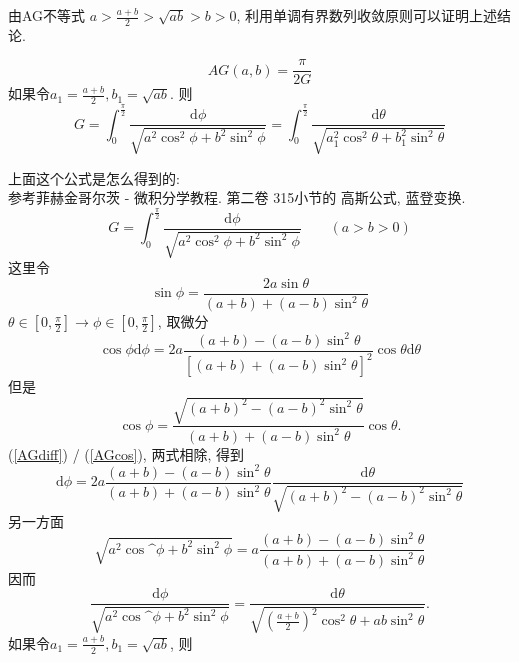 由AG不等式 $ a>\frac{a+b}{2}>\sqrt{ab}>b>0 $, 
利用单调有界数列收敛原则可以证明上述结论.

\begin{equation}\label{AGineqAns}
	AG(a,b)=\frac{\pi}{2G}
\end{equation}
如果令$ a_1 = \frac{a+b}{2}, b_1 = \sqrt{ab} $. 则
\begin{equation}\label{GaussAGineqInt}
	G = \int_{0}^{\frac{\pi}{2}}\frac{\text{d}\phi}{\sqrt{a^2\cos^2\phi+b^2\sin^2\phi}} 
	  = \int_{0}^{\frac{\pi}{2}}\frac{\text{d}\theta}{\sqrt{a_1^2\cos^2\theta+b_1^2\sin^2\theta}} 
\end{equation}

上面这个公式是怎么得到的:\\
参考菲赫金哥尔茨 - 微积分学教程. 第二卷 315小节的 高斯公式, 蓝登变换.\\
\begin{equation}\label{GaussAGineqInt001}
	G = \int_{0}^{\frac{\pi}{2}}\frac{\text{d}\phi}{\sqrt{a^2\cos^2\phi+b^2\sin^2\phi}} \qquad (a>b>0)
\end{equation}
这里令
\begin{equation}\label{LandenTf}
	\sin\phi = \frac{2a\sin\theta}{(a+b)+(a-b)\sin^2\theta}
\end{equation}
$ \theta \in[0,\frac{\pi}{2}] \rightarrow  \phi \in[0,\frac{\pi}{2}] $,
取微分
\begin{equation}\label{AGdiff}
	\cos\phi\text{d}\phi = 2a\frac{(a+b)-(a-b)\sin^2\theta}{[(a+b)+(a-b)\sin^2\theta]^2}\cos\theta\text{d}\theta
\end{equation}
但是
\begin{equation}\label{AGcos}
	\cos\phi = \frac{\sqrt{(a+b)^2-(a-b)^2\sin^2\theta}}{(a+b)+(a-b)\sin^2\theta}\cos\theta.
\end{equation}
(\ref{AGdiff}) / (\ref{AGcos}), 两式相除, 得到
\begin{equation}
	\text{d}\phi = 2a\frac{(a+b)-(a-b)\sin^2\theta}{(a+b)+(a-b)\sin^2\theta}\frac{\text{d}\theta}{\sqrt{(a+b)^2-(a-b)^2\sin^2\theta}}
\end{equation}
另一方面
\begin{equation}
	\sqrt{a^2\cos\^\phi+b^2\sin^2\phi} = a\frac{(a+b)-(a-b)\sin^2\theta}{(a+b)+(a-b)\sin^2\theta}
\end{equation}
因而
\begin{equation}
	\frac{\text{d}\phi}{\sqrt{a^2\cos\^\phi+b^2\sin^2\phi} }
	= \frac{\text{d}\theta}{\sqrt{(\frac{a+b}{2})^2\cos^2\theta+ab\sin^2\theta}}.
\end{equation}
如果令$ a_1 = \frac{a+b}{2}, b_1 = \sqrt{ab} $, 则
